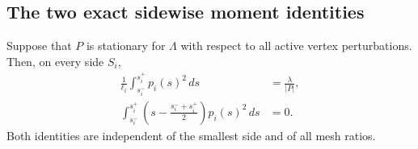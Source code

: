 \subsection{The two exact sidewise moment identities}

\begin{theorem}\label{F57:thm:flux}
Suppose that $P$ is stationary for $\Lambda$ with respect to all active
vertex perturbations.  Then, on every side $S_i$,
\begin{align}
 \frac1{\ell_i}\int_{s_i^-}^{s_i^+}p_i(s)^2\,ds
 &=\frac{\lambda}{|P|},\label{F57:eq:mean}\\
 \int_{s_i^-}^{s_i^+}
 \left(s-\frac{s_i^-+s_i^+}{2}\right)p_i(s)^2\,ds
 &=0.\label{F57:eq:first-moment}
\end{align}
Both identities are independent of the smallest side and of all mesh
ratios.
\end{theorem}

